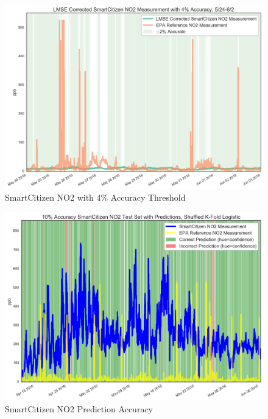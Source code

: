 \begin{figure}[htb]
 	\includegraphics[width=\textwidth]{figs/sck_no2_with_4_accuracy_zoomed}               
 	 \caption{SmartCitizen NO2 with 4\% Accuracy Threshold}
  	\label{fig:sck_no2_with_4_accuracy_zoomed}
\end{figure}

\begin{figure}[htb]
 	\includegraphics[width=\textwidth]{figs/sck_no2_10_logistic_predictions}               
 	 \caption{SmartCitizen NO2 Prediction Accuracy}
  	\label{fig:sck_no2_10_logistic_predictions}
\end{figure}

